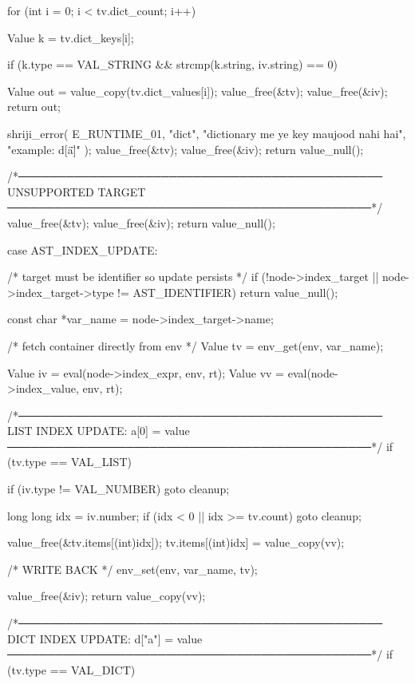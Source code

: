 \documentclass{article}
\begin{document}
{{{{        for (int i = 0; i < tv.dict_count; i++) {

            Value k = tv.dict_keys[i];

            if (k.type == VAL_STRING &&
                strcmp(k.string, iv.string) == 0) {

                Value out = value_copy(tv.dict_values[i]);
                value_free(&tv);
                value_free(&iv);
                return out;
            }
        }

        shriji_error(
            E_RUNTIME_01,
            "dict",
            "dictionary me ye key maujood nahi hai",
            "example: d[\"a\"]"
        );
        value_free(&tv);
        value_free(&iv);
        return value_null();
    }

    /*──────────────────────────────────────────────
      UNSUPPORTED TARGET
    ──────────────────────────────────────────────*/
    value_free(&tv);
    value_free(&iv);
    return value_null();
}


case AST_INDEX_UPDATE: {

    /* target must be identifier so update persists */
    if (!node->index_target || node->index_target->type != AST_IDENTIFIER) {
        return value_null();
    }

    const char *var_name = node->index_target->name;

    /* fetch container directly from env */
    Value tv = env_get(env, var_name);

    Value iv = eval(node->index_expr, env, rt);
    Value vv = eval(node->index_value, env, rt);

    /*──────────────────────────────────────────────
      LIST INDEX UPDATE: a[0] = value
    ──────────────────────────────────────────────*/
    if (tv.type == VAL_LIST) {

        if (iv.type != VAL_NUMBER) goto cleanup;

        long long idx = iv.number;
        if (idx < 0 || idx >= tv.count) goto cleanup;

        value_free(&tv.items[(int)idx]);
        tv.items[(int)idx] = value_copy(vv);

        /* WRITE BACK */
        env_set(env, var_name, tv);

        value_free(&iv);
        return value_copy(vv);
    }

    /*──────────────────────────────────────────────
      DICT INDEX UPDATE: d["a"] = value
    ──────────────────────────────────────────────*/
    if (tv.type == VAL_DICT) {

}}}}
\end{document}
